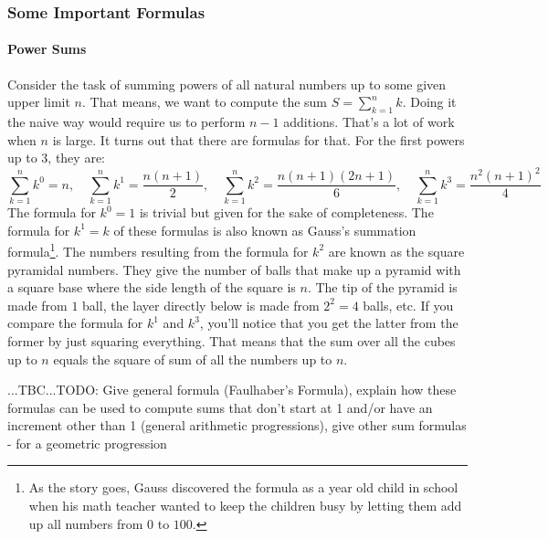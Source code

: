 


\subsubsection{Some Important Formulas}

\paragraph{Power Sums}
Consider the task of summing powers of all natural numbers up to some given upper limit $n$. That means, we want to compute the sum $S = \sum_{k=1}^{n} k$. Doing it the naive way would require us to perform $n-1$ additions. That's a lot of work when $n$ is large. It turns out that there are formulas for that. For the first powers up to 3, they are:
\begin{equation}
\sum_{k=1}^{n} k^0 = n, \quad
\sum_{k=1}^{n} k^1 = \frac{n (n+1)}{2}, \quad
\sum_{k=1}^{n} k^2 = \frac{n (n+1) (2 n  + 1) }{6}, \quad
\sum_{k=1}^{n} k^3 = \frac{n^2 (n+1)^2}{4}
\end{equation}
The formula for $k^0 = 1$ is trivial but given for the sake of completeness. The formula for $k^1 = k$ of these formulas is also known as Gauss's summation formula\footnote{As the story goes, Gauss discovered the formula as a year old child in school when his math teacher wanted to keep the children busy by letting them add up all numbers from $0$ to $100$.}. The numbers resulting from the formula for $k^2$ are known as the square pyramidal numbers. They give the number of balls that make up a pyramid with a square base where the side length of the square is $n$. The tip of the pyramid is made from $1$ ball, the layer directly below is made from $2^2 = 4$ balls, etc. If you compare the formula for $k^1$ and $k^3$, you'll notice that you get the latter from the former by just squaring everything. That means that the sum over all the cubes up to $n$ equals the square of sum of all the numbers up to $n$.

...TBC...TODO: Give general formula (Faulhaber's Formula), explain how these formulas can be used to compute sums that don't start at 1 and/or have an increment other than 1 (general arithmetic progressions), give other sum formulas - for a geometric progression

